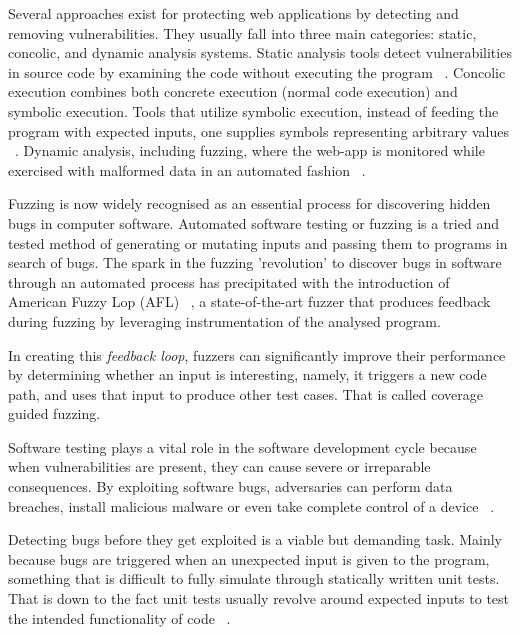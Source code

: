 Several approaches exist for protecting web applications by detecting and removing vulnerabilities. They usually fall into three main categories: static, concolic, and dynamic analysis systems. Static analysis tools detect vulnerabilities in source code by examining the code without executing the program ~\cite{balzarotti2008saner,jovanovic2006pixy,jovanovic2006precise,medeiros2014mining,medeiros2016dekant}.
Concolic execution combines both concrete execution (\ie normal code execution) and symbolic execution. Tools that utilize symbolic execution, instead of feeding the program with expected inputs, one supplies symbols representing arbitrary values ~\cite{king1976symoblic,Godefroid2008AutomatedWF}. Dynamic analysis, including fuzzing, where the web-app is monitored while exercised with malformed data in an automated fashion ~\cite{mller1990fuzz,godefroid2012sage,doupe2012enemy,duchene2014kameleonfuzz}.

Fuzzing is now widely recognised as an essential process for discovering hidden bugs in computer software. Automated software testing or fuzzing is a tried and tested method of generating or mutating inputs and passing them to programs in search of bugs. The spark in the fuzzing 'revolution' to discover bugs in software through an automated process has precipitated with the introduction of American Fuzzy Lop (AFL) ~\cite{zalewski2015american}, a state-of-the-art fuzzer that produces feedback during fuzzing by leveraging instrumentation of the analysed program. 

In creating this \textit{feedback loop}, fuzzers can significantly improve their performance by determining whether an input is interesting, namely, it triggers a new code path, and uses that input to produce other test cases. That is called coverage guided fuzzing.

Software testing plays a vital role in the software development cycle because when vulnerabilities are present, they can cause severe or irreparable consequences. By exploiting software bugs, adversaries can perform data breaches, install malicious malware or even take complete control of a device ~\cite{hackerscontrol,facebook_data_breach}.

Detecting bugs before they get exploited is a viable but demanding task. Mainly because bugs are triggered when an unexpected input is given to the program, something that is difficult to fully simulate through statically written unit tests. That is down to the fact unit tests usually revolve around expected inputs to test the intended functionality of code ~\cite{aschermann2019nautilus}.

